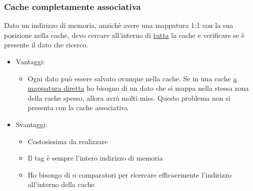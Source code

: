 \subsubsection*{Cache completamente associativa}
Dato un indirizzo di memoria, anzichè avere una mappatura 1:1 con la sua posizione nella cache, devo cercare all'interno di \underline{tutta} la cache e verificare se è presente il dato che ricerco.
\begin{itemize}
	\item Vantaggi:
	      \begin{itemize}
		      \item Ogni dato può essere salvato ovunque nella cache. Se in una cache \underline{a mappatura diretta} ho bisogno di un dato che si mappa nella stessa zona della cache spesso, allora avrà molti miss. Questo problema non si presenta con la cache associativa
	      \end{itemize}
	\item Svantaggi:
	      \begin{itemize}
		      \item Costosissima da realizzare
		      \item Il tag è sempre l'intero indirizzo di memoria
		      \item Ho bisongo di $ n $ comparatori per ricercare efficacemente l'indirizzo all'interno della cache
	      \end{itemize}
\end{itemize}
